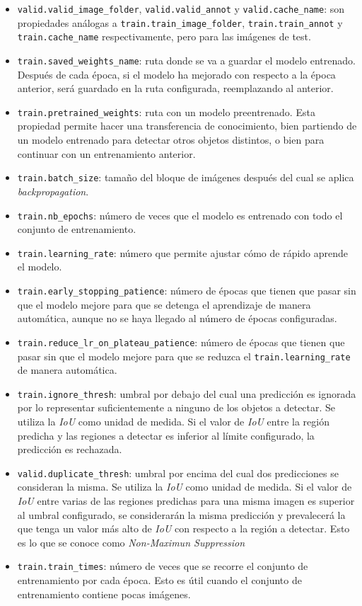 \begin{itemize}
	\item \texttt{valid.valid\_image\_folder}, \texttt{valid.valid\_annot} y \texttt{valid.cache\_name}: son propiedades análogas a \texttt{train.train\_image\_folder}, \texttt{train.train\_annot} y \texttt{train.cache\_name} respectivamente, pero para las imágenes de test.
	\item \texttt{train.saved\_weights\_name}: ruta donde se va a guardar el modelo entrenado. Después de cada época, si el modelo ha mejorado con respecto a la época anterior, será guardado en la ruta configurada, reemplazando al anterior.
	\item \texttt{train.pretrained\_weights}: ruta con un modelo preentrenado. Esta propiedad permite hacer una transferencia de conocimiento, bien partiendo de un modelo entrenado para detectar otros objetos distintos, o bien para continuar con un entrenamiento anterior.
	\item \texttt{train.batch\_size}: tamaño del bloque de imágenes después del cual se aplica \textit{backpropagation}.
	\item \texttt{train.nb\_epochs}: número de veces que el modelo es entrenado con todo el conjunto de entrenamiento.
	\item \texttt{train.learning\_rate}: número que permite ajustar cómo de rápido aprende el modelo.
	\item \texttt{train.early\_stopping\_patience}: número de épocas que tienen que pasar sin que el modelo mejore para que se detenga el aprendizaje de manera automática, aunque no se haya llegado al número de épocas configuradas.
	\item \texttt{train.reduce\_lr\_on\_plateau\_patience}: número de épocas que tienen que pasar sin que el modelo mejore para que se reduzca el \texttt{train.learning\_rate} de manera automática.
	\item \texttt{train.ignore\_thresh}: umbral por debajo del cual una predicción es ignorada por lo representar suficientemente a ninguno de los objetos a detectar. Se utiliza la \textit{IoU} como unidad de medida. Si el valor de \textit{IoU} entre la región predicha y las regiones a detectar es inferior al límite configurado, la predicción es rechazada.
	\item \texttt{valid.duplicate\_thresh}: umbral por encima del cual dos predicciones se consideran la misma. Se utiliza la \textit{IoU} como unidad de medida. Si el valor de \textit{IoU} entre varias de las regiones predichas para una misma imagen es superior al umbral configurado, se considerarán la misma predicción y prevalecerá la que tenga un valor más alto de \textit{IoU} con respecto a la región a detectar. Esto es lo que se conoce como \textit{Non-Maximun Suppression} \cite{s6_nonmaximunsuppression}
	\item \texttt{train.train\_times}: número de veces que se recorre el conjunto de entrenamiento por cada época. Esto es útil cuando el conjunto de entrenamiento contiene pocas imágenes.
\end{itemize}

